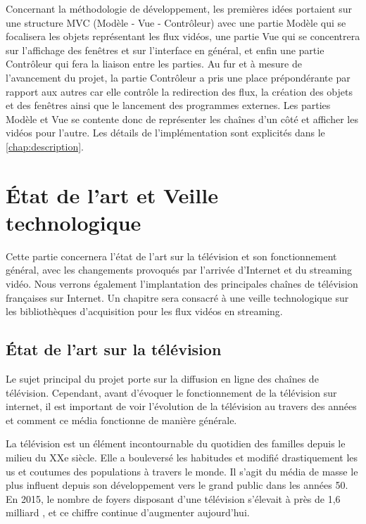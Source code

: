 \documentclass{polytech/polytech}
\begin{document}
Concernant la méthodologie de développement, les premières idées portaient sur une structure MVC (Modèle - Vue - Contrôleur) avec une partie Modèle qui se focalisera les objets représentant les flux vidéos, une partie Vue qui se concentrera sur l'affichage des fenêtres et sur l'interface en général, et enfin une partie Contrôleur qui fera la liaison entre les parties. Au fur et à mesure de l'avancement du projet, la partie Contrôleur a pris une place prépondérante par rapport aux autres car elle contrôle la redirection des flux, la création des objets et des fenêtres ainsi que le lancement des programmes externes. Les parties Modèle et Vue se contente donc de représenter les chaînes d'un côté et afficher les vidéos pour l'autre. Les détails de l'implémentation sont explicités dans le \autoref{chap:description}.


\part{\'{E}tat de l'art et Veille technologique}


Cette partie concernera l'état de l'art sur la télévision et son fonctionnement général, avec les changements provoqués par l'arrivée d'Internet et du streaming vidéo. Nous verrons également l'implantation des principales chaînes de télévision françaises sur Internet. Un chapitre sera consacré à une veille technologique sur les bibliothèques d'acquisition pour les flux vidéos en streaming. 


\chapter{\'{E}tat de l'art sur la télévision}


Le sujet principal du projet porte sur la diffusion en ligne des chaînes de télévision. Cependant, avant d'évoquer le fonctionnement de la télévision sur internet, il est important de voir l'évolution de la télévision au travers des années et comment ce média fonctionne de manière générale.

La télévision est un élément incontournable du quotidien des familles depuis le milieu du XXe siècle. Elle a bouleversé les habitudes et modifié drastiquement les us et coutumes des populations à travers le monde. Il s'agit du média de masse \cite{_medias_2018} le plus influent depuis son développement vers le grand public dans les années 50. En 2015, le nombre de foyers disposant d'une télévision s'élevait à près de 1,6 milliard \cite{_combien_2016}, et ce chiffre continue d'augmenter aujourd'hui. 
\end{document}
